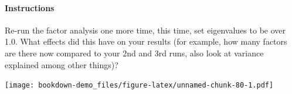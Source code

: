 \documentclass[]{book}
\newenvironment{Shaded}{\begin{snugshade}}{\end{snugshade}}
\newcommand{\KeywordTok}[1]{\textcolor[rgb]{0.13,0.29,0.53}{\textbf{#1}}}
\newcommand{\DataTypeTok}[1]{\textcolor[rgb]{0.13,0.29,0.53}{#1}}
\newcommand{\DecValTok}[1]{\textcolor[rgb]{0.00,0.00,0.81}{#1}}
\newcommand{\FloatTok}[1]{\textcolor[rgb]{0.00,0.00,0.81}{#1}}
\newcommand{\StringTok}[1]{\textcolor[rgb]{0.31,0.60,0.02}{#1}}
\newcommand{\CommentTok}[1]{\textcolor[rgb]{0.56,0.35,0.01}{\textit{#1}}}
\newcommand{\OperatorTok}[1]{\textcolor[rgb]{0.81,0.36,0.00}{\textbf{#1}}}
\newcommand{\NormalTok}[1]{#1}
\let\oldparagraph\paragraph
\renewcommand{\paragraph}[1]{\oldparagraph{#1}\mbox{}}
\theoremstyle{definition}
\theoremstyle{definition}
\theoremstyle{definition}
\theoremstyle{remark}
\begin{document}
\paragraph{Instructions}\label{instructions-1}

Re-run the factor analysis one more time, this time, set eigenvalues to
be over 1.0. What effects did this have on your results (for example,
how many factors are there now compared to your 2nd and 3rd runs, also
look at variance explained among other things)?

\begin{Shaded}
\end{Shaded}

\texttt{[image: bookdown-demo\_files/figure-latex/unnamed-chunk-80-1.pdf]}

\begin{Shaded}
\end{Shaded}
\end{document}

